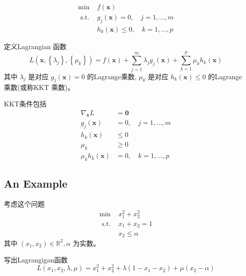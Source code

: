 \begin{definition}
    $$
\begin{array}{ll}
\min & f(\mathbf{x}) \\
\text { s.t. } & g_{j}(\mathbf{x})=0, \quad j=1, \ldots, m \\
& h_{k}(\mathbf{x}) \leq 0, \quad k=1, \ldots, p
\end{array}
$$
\end{definition}

\begin{theorem}[标准约束优化的KKT条件]
    定义Lagrangian 函数
$$
L\left(\mathbf{x},\left\{\lambda_{j}\right\},\left\{\mu_{k}\right\}\right)=f(\mathbf{x})+\sum_{j=1}^{m} \lambda_{j} g_{j}(\mathbf{x})+\sum_{k=1}^{p} \mu_{k} h_{k}(\mathbf{x})
$$
其中 $ \lambda_{j} $ 是对应 $ g_{j}(\mathbf{x})=0 $ 的Lagrange乘数, $ \mu_{k} $ 是对应 $ h_{k}(\mathbf{x}) \leq 0 $ 的Lagrange乘数(或称KKT 乘数)。 

KKT条件包括
$$
\begin{aligned}
\nabla_{\mathbf{x}} L &=\mathbf{0} \\
g_{j}(\mathbf{x}) &=0, \quad j=1, \ldots, m \\
h_{k}(\mathbf{x}) & \leq 0 \\
\mu_{k} & \geq 0 \\
\mu_{k} h_{k}(\mathbf{x}) &=0, \quad k=1, \ldots, p
\end{aligned}
$$

\end{theorem}


\subsection{An Example}

\begin{problem}

    考虑这个问题
$$
\begin{array}{ll}
\min & x_{1}^{2}+x_{2}^{2} \\
\text { s.t. } & x_{1}+x_{2}=1 \\
& x_{2} \leq \alpha
\end{array}
$$
其中 $ \left(x_{1}, x_{2}\right) \in \mathbb{R}^{2}, \alpha $ 为实数。
\end{problem}

写出Lagrangigan函数
$$
L\left(x_{1}, x_{2}, \lambda, \mu\right)=x_{1}^{2}+x_{2}^{2}+\lambda\left(1-x_{1}-x_{2}\right)+\mu\left(x_{2}-\alpha\right)
$$

